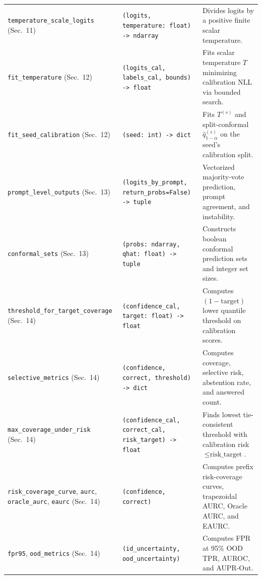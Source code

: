 \documentclass[11pt,a4paper]{article}
\begin{document}
\begin{small}
\begin{longtable}{L{0.29\textwidth} L{0.26\textwidth} L{0.36\textwidth}}
\texttt{temperature\_\allowbreak{}scale\_\allowbreak{}logits} (Sec.~11) & \texttt{(\allowbreak{}logits,\allowbreak{} temperature: float) -> ndarray} & Divides logits by a positive finite scalar temperature. \\
\texttt{fit\_\allowbreak{}temperature} (Sec.~12) & \texttt{(\allowbreak{}logits\_\allowbreak{}cal,\allowbreak{} labels\_\allowbreak{}cal,\allowbreak{} bounds) -> float} & Fits scalar temperature $T$ minimizing calibration NLL via bounded search. \\
\texttt{fit\_\allowbreak{}seed\_\allowbreak{}calibration} (Sec.~12) & \texttt{(\allowbreak{}seed: int) -> dict} & Fits $T^{(s)}$ and split-conformal $\hat{q}_{1-\alpha}^{(s)}$ on the seed's calibration split. \\
\texttt{prompt\_\allowbreak{}level\_\allowbreak{}outputs} (Sec.~13) & \texttt{(\allowbreak{}logits\_\allowbreak{}by\_\allowbreak{}prompt,\allowbreak{} return\_\allowbreak{}probs=False) -> tuple} & Vectorized majority-vote prediction, prompt agreement, and instability. \\
\texttt{conformal\_\allowbreak{}sets} (Sec.~13) & \texttt{(\allowbreak{}probs: ndarray,\allowbreak{} qhat: float) -> tuple} & Constructs boolean conformal prediction sets and integer set sizes. \\
\texttt{threshold\_\allowbreak{}for\_\allowbreak{}target\_\allowbreak{}coverage} (Sec.~14) & \texttt{(\allowbreak{}confidence\_\allowbreak{}cal,\allowbreak{} target: float) -> float} & Computes $(1 - \text{target})$ lower quantile threshold on calibration scores. \\
\texttt{selective\_\allowbreak{}metrics} (Sec.~14) & \texttt{(\allowbreak{}confidence,\allowbreak{} correct,\allowbreak{} threshold) -> dict} & Computes coverage, selective risk, abstention rate, and answered count. \\
\texttt{max\_\allowbreak{}coverage\_\allowbreak{}under\_\allowbreak{}risk} (Sec.~14) & \texttt{(\allowbreak{}confidence\_\allowbreak{}cal,\allowbreak{} correct\_\allowbreak{}cal,\allowbreak{} risk\_\allowbreak{}target) -> float} & Finds lowest tie-consistent threshold with calibration risk $\le \text{risk\_target}$. \\
\texttt{risk\_\allowbreak{}coverage\_\allowbreak{}curve}, \texttt{aurc}, \texttt{oracle\_\allowbreak{}aurc}, \texttt{eaurc} (Sec.~14) & \texttt{(\allowbreak{}confidence,\allowbreak{} correct)} & Computes prefix risk-coverage curves, trapezoidal AURC, Oracle AURC, and EAURC. \\
\texttt{fpr95}, \texttt{ood\_\allowbreak{}metrics} (Sec.~14) & \texttt{(\allowbreak{}id\_\allowbreak{}uncertainty,\allowbreak{} ood\_\allowbreak{}uncertainty)} & Computes FPR at 95\% OOD TPR, AUROC, and AUPR-Out. \\

\end{longtable}
\end{small}
\end{document}
